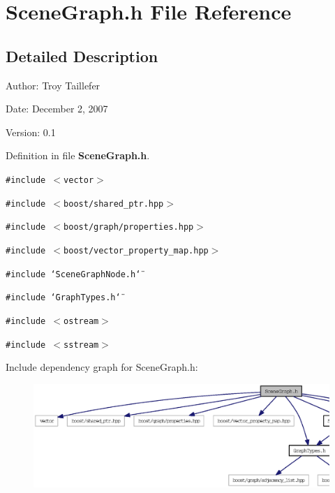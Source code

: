\section{SceneGraph.h File Reference}
\label{SceneGraph_8h}


\subsection{Detailed Description}
\begin{Desc}
\item[Author:]Troy Taillefer \end{Desc}


\begin{Desc}
\item[Date:]December 2, 2007 \end{Desc}
\begin{Desc}
\item[Version:]0.1 \end{Desc}


Definition in file {\bf SceneGraph.h}.

{\tt \#include $<$vector$>$}\par
{\tt \#include $<$boost/shared\_\-ptr.hpp$>$}\par
{\tt \#include $<$boost/graph/properties.hpp$>$}\par
{\tt \#include $<$boost/vector\_\-property\_\-map.hpp$>$}\par
{\tt \#include \char`\"{}SceneGraphNode.h\char`\"{}}\par
{\tt \#include \char`\"{}GraphTypes.h\char`\"{}}\par
{\tt \#include $<$ostream$>$}\par
{\tt \#include $<$sstream$>$}\par


Include dependency graph for SceneGraph.h:\nopagebreak
\begin{figure}[H]
\begin{center}
\leavevmode
\includegraphics[width=397pt]{SceneGraph_8h__incl}
\end{center}
\end{figure}



